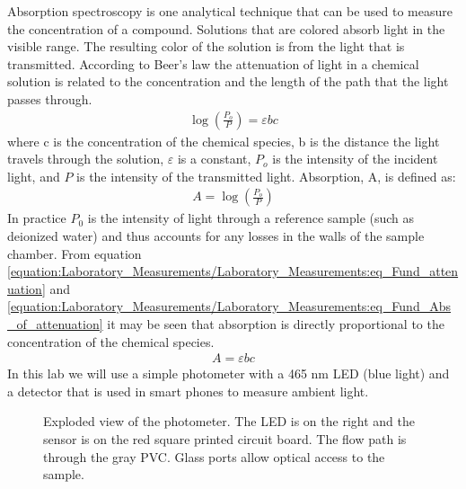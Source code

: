 \documentclass[letterpaper,10pt,english]{sphinxmanual}
\let\sphinxpxdimen\pdfpxdimen\else\newdimen\sphinxpxdimen
\begin{document}
Absorption spectroscopy is one analytical technique that can be used to measure the concentration of a compound. Solutions that are colored absorb light in the visible range. The resulting color of the solution is from the light that is transmitted. According to Beer’s law the attenuation of light in a chemical solution is related to the concentration and the length of the path that the light passes through.
\begin{equation}\label{equation:Laboratory_Measurements/Laboratory_Measurements:eq_Fund_attenuation}
\begin{split} \log \left(\frac{P_o }{P} \right)=\varepsilon bc\end{split}
\end{equation}
where c is the concentration of the chemical species, b is the distance the light travels through the solution, \(\varepsilon\) is a constant, \(P_o\) is the intensity of the incident light, and \(P\) is the intensity of the transmitted light. Absorption, A, is defined as:
\begin{equation}\label{equation:Laboratory_Measurements/Laboratory_Measurements:eq_Fund_Abs_of_attenuation}
\begin{split} A=\log \left(\frac{P_{o} }{P} \right)\end{split}
\end{equation}
In practice \(P_0\) is the intensity of light through a reference sample (such as deionized water) and thus accounts for any losses in the walls of the sample chamber. From equation \eqref{equation:Laboratory_Measurements/Laboratory_Measurements:eq_Fund_attenuation} and \eqref{equation:Laboratory_Measurements/Laboratory_Measurements:eq_Fund_Abs_of_attenuation} it may be seen that absorption is directly proportional to the concentration of the chemical species.
\begin{equation}\label{equation:Laboratory_Measurements/Laboratory_Measurements:eq_Fund_Beer}
\begin{split} A=\varepsilon bc\end{split}
\end{equation}
In this lab we will use a simple photometer with a 465 nm LED (blue light) and a detector that is used in smart phones to measure ambient light.

\begin{figure}[htbp]
\centering
\capstart

\noindent\sphinxincludegraphics[width=300\sphinxpxdimen]{{Photometer_exploded}.jpg}
\caption{Exploded view of the photometer. The LED is on the right and the sensor is on the red square printed circuit board. The flow path is through the gray PVC. Glass ports allow optical access to the sample.}\label{\detokenize{Laboratory_Measurements/Laboratory_Measurements:id4}}\label{\detokenize{Laboratory_Measurements/Laboratory_Measurements:figure-spectrophotometer}}\end{figure}
\end{document}
